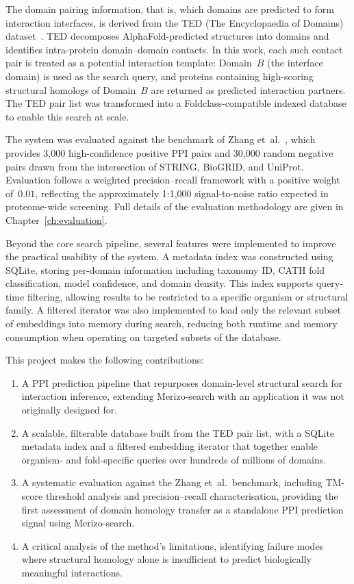 The domain pairing information, that is, which domains are predicted to form interaction interfaces, is derived from the TED (The Encyclopaedia of Domains) dataset~\cite{ted_dataset}.
TED decomposes AlphaFold-predicted structures into domains and identifies intra-protein domain--domain contacts.
In this work, each such contact pair is treated as a potential interaction template: Domain~$B$ (the interface domain) is used as the search query, and proteins containing high-scoring structural homologs of Domain~$B$ are returned as predicted interaction partners.
The TED pair list was transformed into a Foldclass-compatible indexed database to enable this search at scale.

The system was evaluated against the benchmark of Zhang et~al.~\cite{zhang2025ppi}, which provides 3{,}000 high-confidence positive PPI pairs and 30{,}000 random negative pairs drawn from the intersection of STRING, BioGRID, and UniProt.
Evaluation follows a weighted precision--recall framework with a positive weight of~$0.01$, reflecting the approximately 1:1{,}000 signal-to-noise ratio expected in proteome-wide screening.
Full details of the evaluation methodology are given in Chapter~\ref{ch:evaluation}.

Beyond the core search pipeline, several features were implemented to improve the practical usability of the system.
A metadata index was constructed using SQLite, storing per-domain information including taxonomy ID, CATH fold classification, model confidence, and domain density.
This index supports query-time filtering, allowing results to be restricted to a specific organism or structural family.
A filtered iterator was also implemented to load only the relevant subset of embeddings into memory during search, reducing both runtime and memory consumption when operating on targeted subsets of the database.

This project makes the following contributions:
\begin{enumerate}
    \item A PPI prediction pipeline that repurposes domain-level structural search for interaction inference, extending Merizo-search with an application it was not originally designed for.
    \item A scalable, filterable database built from the TED pair list, with a SQLite metadata index and a filtered embedding iterator that together enable organism- and fold-specific queries over hundreds of millions of domains.
    \item A systematic evaluation against the Zhang et~al.\ benchmark, including TM-score threshold analysis and precision--recall characterisation, providing the first assessment of domain homology transfer as a standalone PPI prediction signal using Merizo-search.
    \item A critical analysis of the method's limitations, identifying failure modes where structural homology alone is insufficient to predict biologically meaningful interactions.
\end{enumerate}


